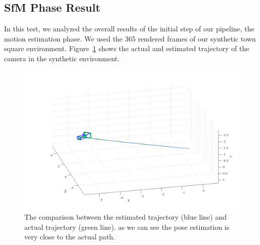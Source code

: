 \subsection{SfM Phase Result}
In this test, we analyzed the overall results of the initial step of our
pipeline, the motion estimation phase. We used the 365 rendered frames of our
synthetic town square environment. Figure~\ref{fig:trajectory} shows the actual
and estimated trajectory of the camera in the synthetic environment.
%
%
\begin{figure}[h]
\centering
\includegraphics[width=\linewidth]{img/trajectory.png}
\caption{The comparison between the estimated trajectory (blue line) and
actual trajectory (green line). as we can see the pose estimation is very close
to the actual path.}
\label{fig:trajectory}
\end{figure}
%
